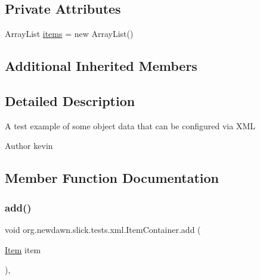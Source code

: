\subsection*{Private Attributes}
\begin{DoxyCompactItemize}
\item 
Array\+List \mbox{\hyperlink{classorg_1_1newdawn_1_1slick_1_1tests_1_1xml_1_1_item_container_a98670bb826569011f0e9d2d1ea088e83}{items}} = new Array\+List()
\end{DoxyCompactItemize}
\subsection*{Additional Inherited Members}


\subsection{Detailed Description}
A test example of some object data that can be configured via X\+ML

\begin{DoxyAuthor}{Author}
kevin 
\end{DoxyAuthor}


\subsection{Member Function Documentation}
\mbox{\label{classorg_1_1newdawn_1_1slick_1_1tests_1_1xml_1_1_item_container_a1ae406b3084fa19e014a43045cdc1d5c}} 
\subsubsection{\texorpdfstring{add()}{add()}}
{\footnotesize\ttfamily void org.\+newdawn.\+slick.\+tests.\+xml.\+Item\+Container.\+add (\begin{DoxyParamCaption}\item[{\mbox{\hyperlink{classorg_1_1newdawn_1_1slick_1_1tests_1_1xml_1_1_item}{Item}}}]{item }\end{DoxyParamCaption})\hspace{0.3cm}{\ttfamily [inline]}, {\ttfamily [private]}}

